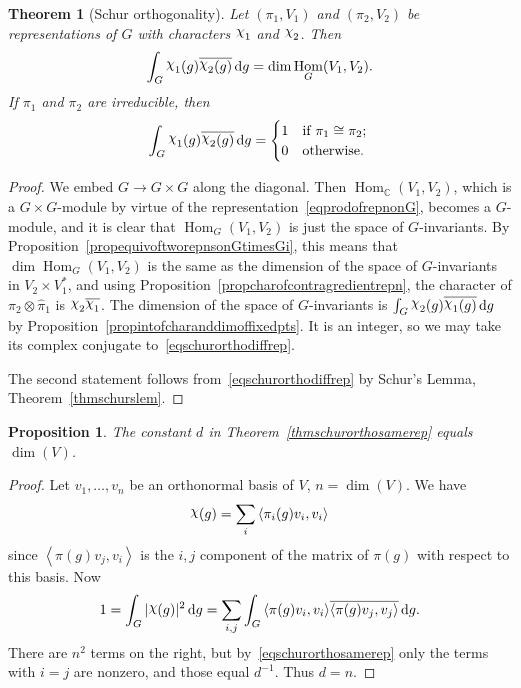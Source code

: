 \documentclass[12pt,reqno]{book}%
\newtheorem{theorem}{Theorem}[chapter]
\newtheorem{proposition}{Proposition}[chapter]
\theoremstyle{definition}
\theoremstyle{remark}
\theoremstyle{theorem}
\theoremstyle{remark}
\newcommand{\mychi}{\raisebox{2pt}{$\chi$}}
\renewcommand{\d}{\dd}
\DeclareMathOperator{\Hom}{Hom}
\begin{document}
\begin{theorem}[Schur orthogonality]\label{thmschurorthodiffrep}%
    Let $(\pi_1, V_1)$ and $(\pi_2, V_2)$ be representations of $G$ with characters $\mychi_1$ and $\mychi_2$.
    Then
    \begin{equation}\label{eqschurorthodiffrep}
        \int_{G} \mychi_1(g) \overline{\mychi_2(g)} \, \d g = \dim \Hom_G(V_1, V_2).
    \end{equation}
    If $\pi_1$ and $\pi_2$ are irreducible, then
    \[
        \int_{G} \mychi_1(g) \overline{\mychi_2(g)} \, \d g =
        \begin{cases}
            1 & \text{if} \ \pi_1 \cong \pi_2; \\
            0 & \text{otherwise.} \ 
        \end{cases}
    \]
\end{theorem}%
\begin{proof}%
    We embed $G \to G \times G$ along the diagonal.
    Then $\Hom_\mathbb{C}(V_1, V_2)$, which is a $G \times G$-module by virtue of the representation~\eqref{eqprodofrepnonG}, becomes a $G$-module, and it is clear that $\Hom_G(V_1, V_2)$ is just the space of $G$-invariants.
    By Proposition~\ref{propequivoftworepnsonGtimesGi}, this means that $\dim \Hom_G(V_1, V_2)$ is the same as the dimension of the space of $G$-invariants in $V_2 \times V_1^\ast$, and using Proposition~\ref{propcharofcontragredientrepn}, the character of $\pi_2 \otimes \widehat{\pi}_1$ is $\mychi_2 \overline{\mychi_1}$.
    The dimension of the space of $G$-invariants is $\int_{G} \mychi_2(g) \overline{\mychi_1(g)} \, \d g$ by Proposition~\ref{propintofcharanddimoffixedpts}.
    It is an integer, so we may take its complex conjugate to~\eqref{eqschurorthodiffrep}.

    The second statement follows from~\eqref{eqschurorthodiffrep} by Schur's Lemma, Theorem~\ref{thmschurslem}.
\end{proof}%

\begin{proposition}\label{prop2.11}%
    The constant $d$ in Theorem~\ref{thmschurorthosamerep} equals $\dim (V)$.
\end{proposition}%
\begin{proof}%
    Let $v_1, \ldots, v_n$ be an orthonormal basis of $V$, $n = \dim (V)$.
    We have
    \[
        \mychi(g) = \sum_{i} {\left\langle \pi_i(g) v_i, v_i\right\rangle}
    \]
    since ${\left\langle \pi(g)v_j, v_i\right\rangle}$ is the $i, j$ component of the matrix of $\pi(g)$ with respect to this basis.
    Now
    \[
        1 = \int_{G} |\mychi(g)|^2 \, \d g = \sum_{i, j} \int_{G} {\left\langle \pi(g) v_i, v_i\right\rangle} \overline{{\left\langle \pi(g)v_j, v_j\right\rangle}} \, \d g.
    \]
    There are $n^2$ terms on the right, but by~\eqref{eqschurorthosamerep} only the terms with $i = j$ are nonzero, and those equal $d^{-1}$.
    Thus $d = n$.
\end{proof}%
\end{document}
